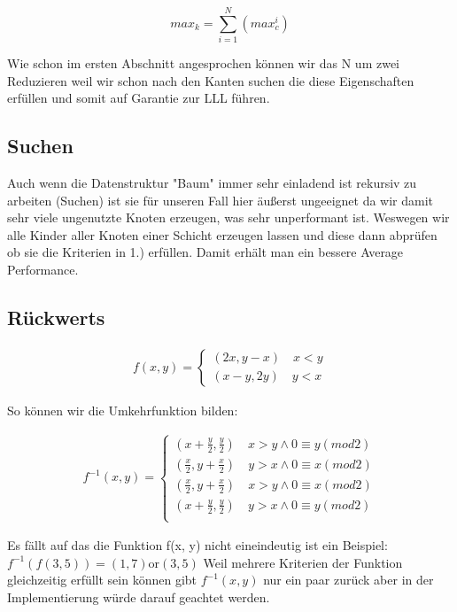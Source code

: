 \documentclass{article}
\begin{document}
\begin{equation}
	max_k =  \sum \limits_{i=1}^N  (max_c ^ i)
\end{equation}

Wie schon im ersten Abschnitt angesprochen können wir das N um zwei Reduzieren weil wir schon nach den Kanten suchen die diese Eigenschaften erfüllen und somit auf Garantie zur LLL führen.

\subsection*{ Suchen }


Auch wenn die Datenstruktur "Baum" immer sehr einladend ist rekursiv zu arbeiten (Suchen) ist sie für unseren Fall hier äußerst ungeeignet da wir damit sehr viele ungenutzte Knoten erzeugen, was sehr unperformant ist. Weswegen wir alle Kinder aller Knoten einer Schicht erzeugen lassen und diese dann abprüfen ob sie die Kriterien in 1.) erfüllen. Damit erhält man ein bessere Average Performance.

\subsection*{ Rückwerts }


\begin{gather}
    f(x, y) =  
    \begin{cases}
    	(2x, y - x)		\quad x < y \\
    	(x - y, 2y) 		\quad y < x
    \end{cases}
\end{gather}

So können wir die Umkehrfunktion bilden:

\begin{gather}
   	f^{-1}(x, y) =  
    \begin{cases}
    	(x + \frac{y}{2},  \frac{y}{2})		\quad x > y \wedge 0 \equiv y (mod 2) \\
    	(\frac{x}{2},y + \frac{x}{2})		\quad y > x\wedge 0 \equiv x (mod 2) \\
    	(\frac{x}{2}, y + \frac{x}{2})		\quad x > y \wedge 0 \equiv x (mod 2) \\
    	(x + \frac{y}{2}, \frac{y}{2})		\quad y > x\wedge 0 \equiv y (mod 2) \\
    \end{cases}
\end{gather}

Es fällt auf das die Funktion f(x, y) nicht eineindeutig ist ein Beispiel: \(f^{-1}(f(3, 5)) = (1, 7)  \text{or} (3,5) \)
Weil mehrere Kriterien der Funktion gleichzeitig erfüllt sein können gibt \(f^{-1}(x, y) \) nur ein paar zurück aber in der Implementierung würde darauf geachtet werden.
\end{document}
